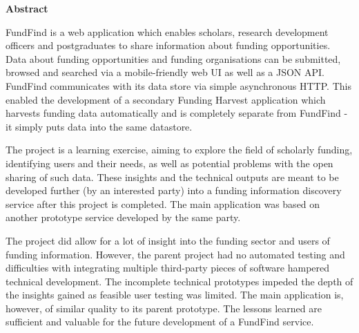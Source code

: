 \thispagestyle{empty}

\begin{center}
    {\LARGE\bf Abstract}
\end{center}

FundFind is a web application which enables scholars, research development officers and postgraduates to share information about funding opportunities. Data about funding opportunities and funding organisations can be submitted, browsed and searched via a mobile-friendly web UI as well as a JSON API. FundFind communicates with its data store via simple asynchronous HTTP. This enabled the development of a secondary Funding Harvest application which harvests funding data automatically and is completely separate from FundFind - it simply puts data into the same datastore.

The project is a learning exercise, aiming to explore the field of scholarly funding, identifying users and their needs, as well as potential problems with the open sharing of such data. These insights and the technical outputs are meant to be developed further (by an interested party) into a funding information discovery service after this project is completed. The main application was based on another prototype service developed by the same party.

The project did allow for a lot of insight into the funding sector and users of funding information. However, the parent project had no automated testing and difficulties with integrating multiple third-party pieces of software hampered technical development. The incomplete technical prototypes impeded the depth of the insights gained as feasible user testing was limited. The main application is, however, of similar quality to its parent prototype. The lessons learned are sufficient and valuable for the future development of a FundFind service.